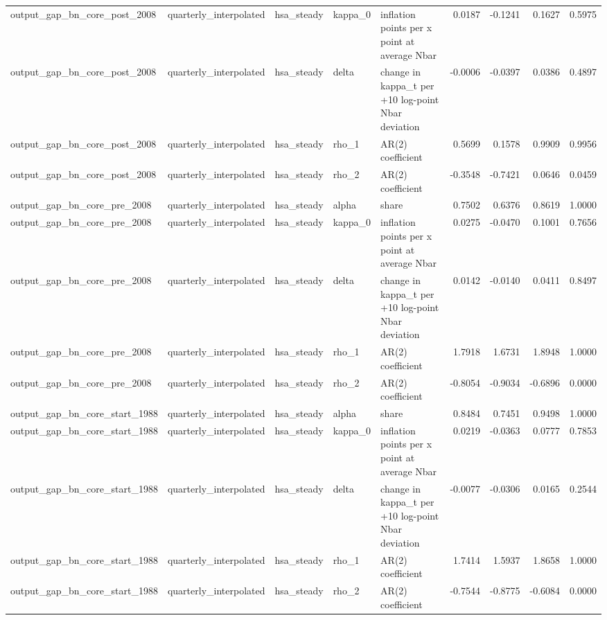 \begin{tabular}{lllllrrrr}
output\_gap\_bn\_core\_post\_2008 & quarterly\_interpolated & hsa\_steady & kappa\_0 & inflation points per x point at average Nbar & 0.0187 & -0.1241 & 0.1627 & 0.5975 \\
output\_gap\_bn\_core\_post\_2008 & quarterly\_interpolated & hsa\_steady & delta & change in kappa\_t per +10 log-point Nbar deviation & -0.0006 & -0.0397 & 0.0386 & 0.4897 \\
output\_gap\_bn\_core\_post\_2008 & quarterly\_interpolated & hsa\_steady & rho\_1 & AR(2) coefficient & 0.5699 & 0.1578 & 0.9909 & 0.9956 \\
output\_gap\_bn\_core\_post\_2008 & quarterly\_interpolated & hsa\_steady & rho\_2 & AR(2) coefficient & -0.3548 & -0.7421 & 0.0646 & 0.0459 \\
output\_gap\_bn\_core\_pre\_2008 & quarterly\_interpolated & hsa\_steady & alpha & share & 0.7502 & 0.6376 & 0.8619 & 1.0000 \\
output\_gap\_bn\_core\_pre\_2008 & quarterly\_interpolated & hsa\_steady & kappa\_0 & inflation points per x point at average Nbar & 0.0275 & -0.0470 & 0.1001 & 0.7656 \\
output\_gap\_bn\_core\_pre\_2008 & quarterly\_interpolated & hsa\_steady & delta & change in kappa\_t per +10 log-point Nbar deviation & 0.0142 & -0.0140 & 0.0411 & 0.8497 \\
output\_gap\_bn\_core\_pre\_2008 & quarterly\_interpolated & hsa\_steady & rho\_1 & AR(2) coefficient & 1.7918 & 1.6731 & 1.8948 & 1.0000 \\
output\_gap\_bn\_core\_pre\_2008 & quarterly\_interpolated & hsa\_steady & rho\_2 & AR(2) coefficient & -0.8054 & -0.9034 & -0.6896 & 0.0000 \\
output\_gap\_bn\_core\_start\_1988 & quarterly\_interpolated & hsa\_steady & alpha & share & 0.8484 & 0.7451 & 0.9498 & 1.0000 \\
output\_gap\_bn\_core\_start\_1988 & quarterly\_interpolated & hsa\_steady & kappa\_0 & inflation points per x point at average Nbar & 0.0219 & -0.0363 & 0.0777 & 0.7853 \\
output\_gap\_bn\_core\_start\_1988 & quarterly\_interpolated & hsa\_steady & delta & change in kappa\_t per +10 log-point Nbar deviation & -0.0077 & -0.0306 & 0.0165 & 0.2544 \\
output\_gap\_bn\_core\_start\_1988 & quarterly\_interpolated & hsa\_steady & rho\_1 & AR(2) coefficient & 1.7414 & 1.5937 & 1.8658 & 1.0000 \\
output\_gap\_bn\_core\_start\_1988 & quarterly\_interpolated & hsa\_steady & rho\_2 & AR(2) coefficient & -0.7544 & -0.8775 & -0.6084 & 0.0000 \\

\end{tabular}
